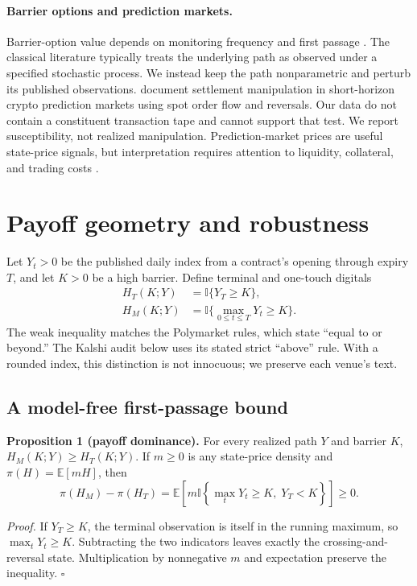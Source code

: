 \documentclass[10pt,twocolumn]{article}
\newcommand{\I}{\mathbb{I}}
\newcommand{\E}{\mathbb{E}}
\begin{document}
\paragraph{Barrier options and prediction markets.}
Barrier-option value depends on monitoring frequency and first passage
\citep{broadie1997}. The classical literature typically treats the underlying
path as observed under a specified stochastic process. We instead keep the path
nonparametric and perturb its published observations. \citet{dai2026} document
settlement manipulation in short-horizon crypto prediction markets using spot
order flow and reversals. Our data do not contain a constituent transaction
tape and cannot support that test. We report susceptibility, not realized
manipulation. Prediction-market prices are useful state-price signals, but
interpretation requires attention to liquidity, collateral, and trading costs
\citep{wolfers2004}.

\section{Payoff geometry and robustness}

Let $Y_t>0$ be the published daily index from a contract's opening through
expiry $T$, and let $K>0$ be a high barrier. Define terminal and one-touch
digitals
\begin{align}
H_T(K;Y)&=\I\{Y_T\ge K\},\\
H_M(K;Y)&=\I\{\max_{0\le t\le T}Y_t\ge K\}.
\end{align}
The weak inequality matches the Polymarket rules, which state ``equal to or
beyond.'' The Kalshi audit below uses its stated strict ``above'' rule. With a
rounded index, this distinction is not innocuous; we preserve each venue's text.

\subsection{A model-free first-passage bound}

\textbf{Proposition 1 (payoff dominance).} For every realized path $Y$ and
barrier $K$, $H_M(K;Y)\ge H_T(K;Y)$. If $m\ge0$ is any state-price density and
$\pi(H)=\E[mH]$, then
\begin{equation}
\pi(H_M)-\pi(H_T)
=\E\!\left[m\I\left\{\max_tY_t\ge K,\;Y_T<K\right\}\right]\ge0.
\label{eq:wedge}
\end{equation}

\textit{Proof.} If $Y_T\ge K$, the terminal observation is itself in the running
maximum, so $\max_tY_t\ge K$. Subtracting the two indicators leaves exactly the
crossing-and-reversal state. Multiplication by nonnegative $m$ and expectation
preserve the inequality. $\square$
\end{document}
